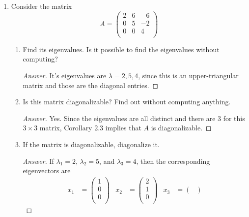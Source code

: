 \documentclass[../psets.tex]{subfiles}
\begin{document}
\begin{enumerate}[label={\textbf{2.\arabic*.}}]
\begin{proof}[Answer]
    \end{proof}
    \item Consider the matrix
    \begin{equation*}
        A =
        \begin{pmatrix}
            2 & 6 & -6\\
            0 & 5 & -2\\
            0 & 0 & 4\\
        \end{pmatrix}
    \end{equation*}
    \begin{enumerate}
        \item Find its eigenvalues. Is it possible to find the eigenvalues without computing?
        \begin{proof}[Answer]
            It's eigenvalues are $\lambda=2,5,4$, since this is an upper-triangular matrix and those are the diagonal entries.
        \end{proof}
        \item Is this matrix diagonalizable? Find out without computing anything.
        \begin{proof}[Answer]
            Yes. Since the eigenvalues are all distinct and there are 3 for this $3\times 3$ matrix, Corollary 2.3 implies that $A$ is diagonalizable.
        \end{proof}
        \item If the matrix is diagonalizable, diagonalize it.
        \begin{proof}[Answer]
            If $\lambda_1=2$, $\lambda_2=5$, and $\lambda_3=4$, then the corresponding eigenvectors are
            \begin{align*}
                x_1 &=
                \begin{pmatrix}
                    1\\
                    0\\
                    0\\
                \end{pmatrix}&
                x_2 &=
                \begin{pmatrix}
                    2\\
                    1\\
                    0\\
                \end{pmatrix}&
                x_3 &=
                \begin{pmatrix}

\end{pmatrix}
\end{align*}
\end{proof}
\end{enumerate}
\end{enumerate}
\end{document}
